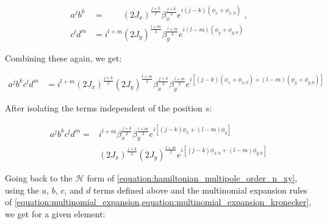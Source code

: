 \begin{equation}
    \begin{aligned}
        a^j b^k &= \phantom{i^{l+m}} (2J_x)^{\frac{j+k}{2}} \beta_x^{\frac{j+k}{2}} e^{i \left(j-k\right) \left(\phi_x + \phi_{x,0}\right)} \text{ ,} \\
        c^l d^m &= i^{l+m}           (2J_y)^{\frac{l+m}{2}} \beta_y^{\frac{l+m}{2}} e^{i \left(l-m\right) \left(\phi_y + \phi_{y,0}\right)}
    \end{aligned}
    \label{equation:ab_cd_combining}
\end{equation}

Combining these again, we get:

\begin{equation}
    \begin{aligned}
        a^j b^k c^l d^m &= i^{l+m} 
                   (2J_x)^{\frac{j+k}{2}} (2J_y)^{\frac{l+m}{2}} 
                   \beta_x^{\frac{j+k}{2}} \beta_y^{\frac{l+m}{2}} 
                   e^{i\left[ (j-k)(\phi_x + \phi_{x,0}) + (l-m)(\phi_y + \phi_{y,0}) \right]}
    \end{aligned}
\end{equation}

After isolating the terms independent of the position \(s\):

\begin{equation}
    \begin{aligned}
        a^j b^k c^l d^m = & i^{l+m} \beta_x^{\frac{j+k}{2}} \beta_y^{\frac{l+m}{2}} e^{i\left[ \left(j-k\right) \phi_x + \left(l-m\right)\phi_y \right]} \\
                          & \left(2 J_x\right)^{\frac{j+k}{2}} \left(2 J_y\right)^{\frac{l+m}{2}} e^{ i\left[ \left(j-k\right) \phi_{x,0} + \left(l-m\right) \phi_{y,0} \right]}
    \end{aligned}
\end{equation}

Going back to the \(\mathcal{H}\) form of \cref{equation:hamiltonian_multipole_order_n_xy}, using the \(a\), \(b\), \(c\), and \(d\) terms defined above and the multinomial expansion rules of \cref{equation:multinomial_expansion,equation:multinomial_expansion_kronecker}, we get for a given element:

